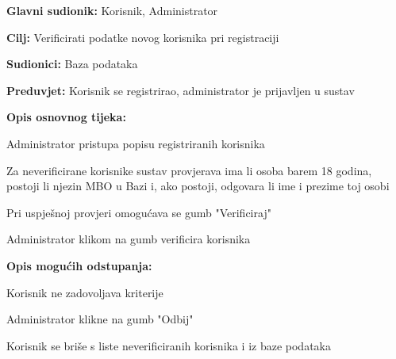 					
					\noindent {}
					\begin{packed_item}
						
						\item \textbf{Glavni sudionik: }Korisnik, Administrator
						\item  \textbf{Cilj:} Verificirati podatke novog korisnika pri registraciji
						\item  \textbf{Sudionici:} Baza podataka
						\item  \textbf{Preduvjet:} Korisnik se registrirao, administrator je prijavljen u sustav
						\item  \textbf{Opis osnovnog tijeka:}
						
						\item[] \begin{packed_enum}
							
							\item Administrator pristupa popisu registriranih korisnika
							\item Za neverificirane korisnike sustav provjerava ima li osoba barem 18 godina, postoji li njezin MBO u Bazi i, ako postoji, odgovara li ime i prezime toj osobi
							\item Pri uspješnoj provjeri omogućava se gumb "Verificiraj"
							\item Administrator klikom na gumb verificira korisnika
						\end{packed_enum}
						
						\item  \textbf{Opis mogućih odstupanja:}
						
						\item[] \begin{packed_item}
							
							\item[4.a] Korisnik ne zadovoljava kriterije
							\item[] \begin{packed_enum}
								
								\item Administrator klikne na gumb "Odbij"
								\item Korisnik se briše s liste neverificiranih korisnika i iz baze podataka
								
							\end{packed_enum}		
							
						\end{packed_item}
					\end{packed_item}
					
